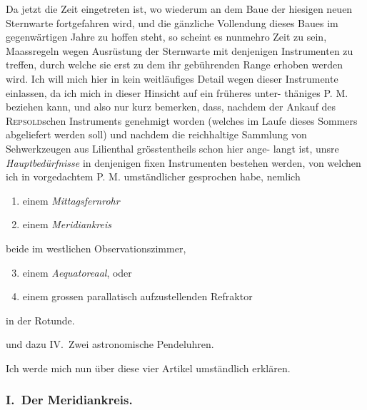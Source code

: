 \documentclass[12pt,a4paper]{article}
\theoremstyle{plain}
\theoremstyle{definition}
\theoremstyle{remark}
\begin{document}
Da jetzt die Zeit eingetreten ist, wo wiederum an dem Baue der hiesigen
neuen Sternwarte fortgefahren wird, und die g\"{a}nzliche Vollendung dieses Baues
im gegenw\"{a}rtigen Jahre zu hoffen steht, so scheint es nunmehro Zeit zu sein,
Maassregeln wegen Ausr\"{u}stung der Sternwarte mit denjenigen Instrumenten
zu treffen, durch welche sie erst zu dem ihr geb\"{u}hrenden Range erhoben
werden wird. Ich will mich hier in kein weitl\"{a}ufiges Detail wegen dieser
Instrumente einlassen, da ich mich in dieser Hinsicht auf ein fr\"{u}heres unter-
th\"{a}niges P. M. beziehen kann, und also nur kurz bemerken, dass, nachdem
der Ankauf des \textsc{Repsold}schen Instruments genehmigt worden (welches im
Laufe dieses Sommers abgeliefert werden soll) und nachdem die reichhaltige
Sammlung von Sehwerkzeugen aus Lilienthal gr\"{o}sstentheils schon hier ange-
langt ist, unsre \textit{Hauptbed\"{u}rfnisse} in denjenigen fixen Instrumenten bestehen
werden, von welchen ich in vorgedachtem P. M. umst\"{a}ndlicher gesprochen
habe, nemlich
\begin{enumerate}[label=\arabic*)]
\item einem \textit{Mittagsfernrohr}
\item einem \textit{Meridiankreis}
\end{enumerate}
\hspace{-0.5em}\raisebox{0.5ex}{$\big\{\hspace{-0.3em}\begin{array}{l}\\[-0.5em]\end{array}$} beide im westlichen Observationszimmer,
\begin{enumerate}[label=\arabic*)]
\setcounter{enumi}{2}
\item einem \textit{Aequatoreaal}, oder
\item[] einem grossen parallatisch aufzustellenden Refraktor
\end{enumerate}
\hspace{-0.5em}\raisebox{0.5ex}{$\big\{\hspace{-0.3em}\begin{array}{l}\\[-0.5em]\end{array}$} in der Rotunde.

\noindent
und dazu \dotfill IV.\ Zwei astronomische Pendeluhren.

Ich werde mich nun \"{u}ber diese vier Artikel umst\"{a}ndlich erkl\"{a}ren.

\subsubsection*{I.\ Der Meridiankreis.}
\end{document}
